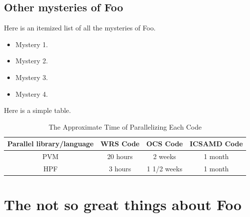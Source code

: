 \documentclass[proposal]{bsu-ms}
\begin{document}
\section{Other mysteries of Foo}

Here is an itemized list of all the mysteries of Foo.
\begin{itemize}
\item Mystery 1.
\item Mystery 2.
\item Mystery 3.
\item Mystery 4.
\end{itemize}


Here is a simple table.

\begin{table}[h] %
\caption{The Approximate Time of Parallelizing Each Code}
\label{table4}
\centering %
\begin{tabular}{|c|c|c|c|}\hline \hline
Parallel library/language  &WRS Code  &OCS Code  &ICSAMD Code\\ \hline
PVM                        &20 hours  &2 weeks   &1 month\\ \hline
HPF                        &3 hours   &1 1/2 weeks  &1 month\\ \hline
\end{tabular}
\end{table}


%
%

\chapter{The not so great things about Foo}
\end{document}
